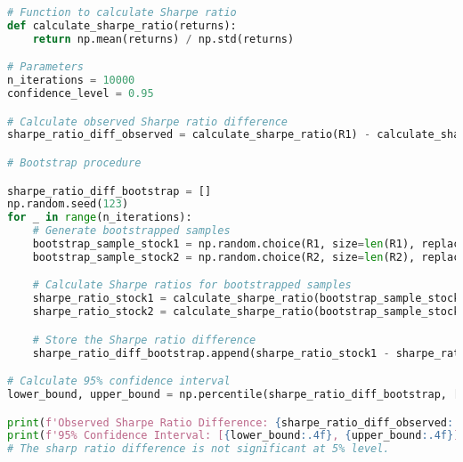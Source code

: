 \begin{enumerate}[(a)]
\begin{lstlisting}[language=Python, caption=Python code for Bootstrapping , label={lst:q1a}, escapechar=|, frame=single, basicstyle=\small, showstringspaces=false, captionpos=b, breaklines=true, showspaces=false, showtabs=false, keywordstyle=\color{blue}, commentstyle=\color{gray}]
  # Function to calculate Sharpe ratio
def calculate_sharpe_ratio(returns):
    return np.mean(returns) / np.std(returns)

# Parameters
n_iterations = 10000
confidence_level = 0.95

# Calculate observed Sharpe ratio difference
sharpe_ratio_diff_observed = calculate_sharpe_ratio(R1) - calculate_sharpe_ratio(R2)

# Bootstrap procedure

sharpe_ratio_diff_bootstrap = []
np.random.seed(123)
for _ in range(n_iterations):
    # Generate bootstrapped samples
    bootstrap_sample_stock1 = np.random.choice(R1, size=len(R1), replace=True)
    bootstrap_sample_stock2 = np.random.choice(R2, size=len(R2), replace=True)

    # Calculate Sharpe ratios for bootstrapped samples
    sharpe_ratio_stock1 = calculate_sharpe_ratio(bootstrap_sample_stock1)
    sharpe_ratio_stock2 = calculate_sharpe_ratio(bootstrap_sample_stock2)

    # Store the Sharpe ratio difference
    sharpe_ratio_diff_bootstrap.append(sharpe_ratio_stock1 - sharpe_ratio_stock2)

# Calculate 95% confidence interval
lower_bound, upper_bound = np.percentile(sharpe_ratio_diff_bootstrap, [(1 - confidence_level) * 100 / 2, confidence_level * 100 - (1 - confidence_level) * 100 / 2])

print(f'Observed Sharpe Ratio Difference: {sharpe_ratio_diff_observed:.4f}')
print(f'95% Confidence Interval: [{lower_bound:.4f}, {upper_bound:.4f}]')
# The sharp ratio difference is not significant at 5% level.

\end{lstlisting}
\end{enumerate}
